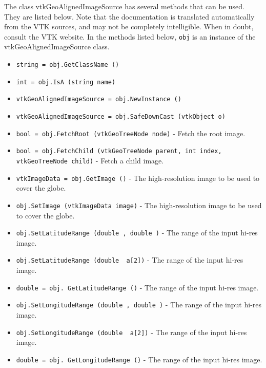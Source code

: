 The class vtkGeoAlignedImageSource has several methods that can be used.
  They are listed below.
Note that the documentation is translated automatically from the VTK sources,
and may not be completely intelligible.  When in doubt, consult the VTK website.
In the methods listed below, \verb|obj| is an instance of the vtkGeoAlignedImageSource class.
\begin{itemize}
\item  \verb|string = obj.GetClassName ()|

\item  \verb|int = obj.IsA (string name)|

\item  \verb|vtkGeoAlignedImageSource = obj.NewInstance ()|

\item  \verb|vtkGeoAlignedImageSource = obj.SafeDownCast (vtkObject o)|

\item  \verb|bool = obj.FetchRoot (vtkGeoTreeNode node)| -  Fetch the root image.

\item  \verb|bool = obj.FetchChild (vtkGeoTreeNode parent, int index, vtkGeoTreeNode child)| -  Fetch a child image.

\item  \verb|vtkImageData = obj.GetImage ()| -  The high-resolution image to be used to cover the globe.

\item  \verb|obj.SetImage (vtkImageData image)| -  The high-resolution image to be used to cover the globe.

\item  \verb|obj.SetLatitudeRange (double , double )| -  The range of the input hi-res image.

\item  \verb|obj.SetLatitudeRange (double  a[2])| -  The range of the input hi-res image.

\item  \verb|double = obj. GetLatitudeRange ()| -  The range of the input hi-res image.

\item  \verb|obj.SetLongitudeRange (double , double )| -  The range of the input hi-res image.

\item  \verb|obj.SetLongitudeRange (double  a[2])| -  The range of the input hi-res image.

\item  \verb|double = obj. GetLongitudeRange ()| -  The range of the input hi-res image.


\end{itemize}
